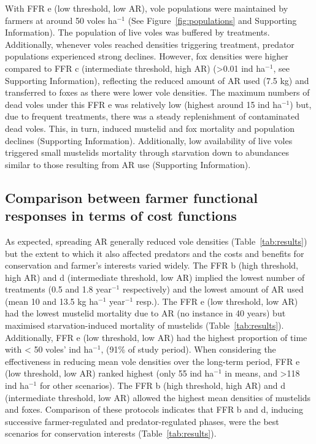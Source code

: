 \documentclass[11pt]{article}
\begin{document}
With FFR e (low threshold, low AR), vole populations were maintained by farmers at around 50 voles ha$^{-1}$ (See Figure~\ref{fig:populations} and Supporting Information). The population of live voles was buffered by treatments. Additionally, whenever voles reached densities triggering treatment, predator populations experienced strong declines. However, fox densities were higher compared to FFR c (intermediate threshold, high AR) (>0.01 ind ha$^{-1}$, see Supporting Information), reflecting the reduced amount of AR used (7.5 kg) and transferred to foxes as there were lower vole densities. The maximum numbers of dead voles under this FFR e was relatively low (highest around 15 ind ha$^{-1}$) but, due to frequent treatments, there was a steady replenishment of contaminated dead voles. This, in turn, induced mustelid and fox mortality and population declines (Supporting Information). Additionally, low availability of live voles triggered small mustelids mortality through starvation down to abundances similar to those resulting from AR use (Supporting Information). 

\subsection{Comparison between farmer functional responses in terms of cost functions}

As expected, spreading AR generally reduced vole densities (Table~\ref{tab:results}) but the extent to which it also affected predators and the costs and benefits for conservation and farmer’s interests varied widely. 
The FFR b (high threshold, high AR) and d (intermediate threshold, low AR) implied the lowest number of treatments (0.5 and 1.8 year$^{-1}$ respectively) and the lowest amount of AR used (mean 10 and 13.5 kg ha$^{-1}$ year$^{-1}$ resp.). The FFR e (low threshold, low AR) had the lowest mustelid mortality due to AR (no instance in 40 years) but maximised starvation-induced mortality of mustelids (Table~\ref{tab:results}). Additionally, FFR e (low threshold, low AR) had the highest proportion of time with < 50 voles' ind ha$^{-1}$, (91\% of study period). When considering the effectiveness in reducing mean vole densities over the long-term period, FFR e (low threshold, low AR) ranked highest (only 55 ind ha$^{-1}$ in means, and >118 ind ha$^{-1}$ for other scenarios). The FFR b (high threshold, high AR) and d (intermediate threshold, low AR) allowed the highest mean densities of mustelids and foxes.
%
Comparison of these protocols indicates that FFR b and d, inducing successive farmer-regulated and predator-regulated phases, were the best scenarios for conservation interests (Table~\ref{tab:results}).
\end{document}
